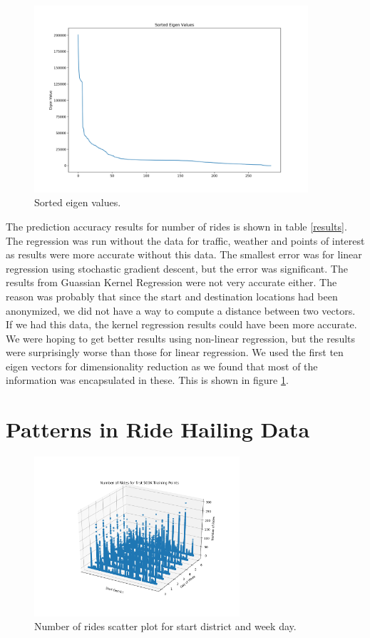 \documentclass[paper=a4, fontsize=11pt]{scrartcl} %
\numberwithin{equation}{section} %
\numberwithin{table}{section} %
\begin{document}
\begin{figure}[!htb]
\centering
\includegraphics[width=4in]{figures/EigenValues.png}
\caption{Sorted eigen values.}
\label{eigen10}
\end{figure}

The prediction accuracy results for number of rides is shown in table \ref{results}. The regression was run without the data for traffic, weather and points of interest as results were more accurate without this data. The smallest error was for linear regression using stochastic gradient descent, but the error was significant. The results from Guassian Kernel Regression were not very accurate either. The reason was probably that since the start and destination locations had been anonymized, we did not have a way to compute a distance between two vectors. If we had this data, the kernel regression results could have been more accurate. We were hoping to get better results using non-linear regression, but the results were surprisingly worse than those for linear regression. We used the first ten eigen vectors for dimensionality reduction as we found that most of the information was encapsulated in these. This is shown in figure \ref{eigen10}.
\section{Patterns in Ride Hailing Data}

\begin{figure}[!htb]
\centering
\includegraphics[width=3in]{figures/Ridesfordistrictsandweekdays3DScatter.png}
\caption{Number of rides scatter plot for start district and week day.}
\label{rides2}
\end{figure}
\end{document}
